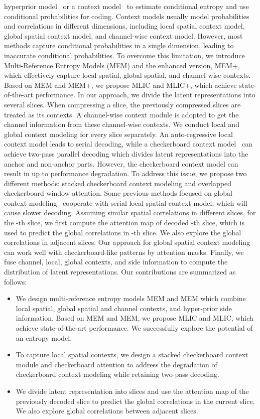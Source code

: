\documentclass[sigconf]{acmart}
\begin{document}
hyperprior model~\cite{balle2018variational} or a context model~\cite{DBLP:conf/nips/MinnenBT18}
to estimate conditional entropy and use conditional probabilities for coding.
Context models usually model probabilities and correlations in different dimensions,
including local spatial context model,
global spatial context model, and channel-wise context model. However,
most methods capture conditional probabilities in a single dimension,
leading to inaccurate conditional probabilities.
To overcome this limitation,
we introduce Multi-Reference Entropy Models (MEM) and  the enhanced version, MEM+,
which effectively capture local spatial, global spatial, and channel-wise contexts.
Based on MEM and MEM+, we propose MLIC and MLIC+,
which achieve state-of-the-art performance. In our approach, we divide the latent representations into several slices.
When compressing a slice, the previously compressed slices
are treated as its contexts. A channel-wise context module is adopted to
get the channel information from these channel-wise contexts.
We conduct local and global context modeling for every slice separately.
An auto-regressive local context model leads to serial decoding,
while a checkerboard context model~\cite{He_2021_CVPR} can achieve two-pass parallel
decoding which divides latent representations into the anchor and non-anchor parts.
However, the checkerboard context model can result in up to  performance degradation.
To address this issue, we propose two different methods:
stacked checkerboard context modeling and overlapped checkerboard window attention.
Some previous methods focused on global context modeling~\cite{DBLP:conf/iclr/QianTSLLSHJ21,
DBLP:journals/tcsv/GuoZFC22} cooperate with serial local spatial context model,
which will cause slower decoding. Assuming similar
spatial correlations in different slices, for the -th slice,
we first compute the attention map of decoded -th slice,
which is used to predict the global correlations in -th slice.
We also explore the global correlations in adjacent slices.
Our approach for global spatial context modeling can work well with
checkerboard-like patterns by attention masks. Finally, we fuse channel,
local, global contexts, and side information to compute the
distribution of latent representations.
Our contributions are summarized as follows:
\begin{itemize}
\item We design multi-reference entropy models MEM and MEM which
combine local spatial, global spatial and channel contexts, and
hyper-prior side information. Based on MEM and MEM,
we propose MLIC and MLIC, which achieve state-of-the-art performance.
We successfully explore the potential of an entropy model.
\item To capture local spatial contexts, we design a stacked
checkerboard context module and checkerboard attention to
address the degradation of checkerboard context modeling while retaining two-pass decoding.
\item We divide latent representation into slices and use the attention map of the
previously decoded slice to predict the global correlations in the current slice.
We also explore global correlations between adjacent slices.
\end{itemize}
\end{document}
